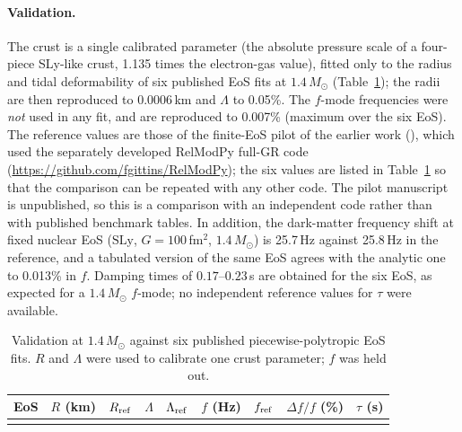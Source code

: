 \documentclass[11pt,a4paper]{article}
\newcommand{\Msun}{M_\odot}
\begin{document}
\paragraph{Validation.} The crust is a single calibrated parameter (the absolute pressure scale of a four-piece SLy-like crust, 1.135 times the electron-gas value), fitted only to the radius and tidal deformability of six published EoS fits at $1.4\,\Msun$ (Table~\ref{tab:valid}); the radii are then reproduced to 0.0006\,km and $\Lambda$ to 0.05\%. The $f$-mode frequencies were \emph{not} used in any fit, and are reproduced to 0.007\% (maximum over the six EoS). The reference values are those of the finite-EoS pilot of the earlier work (\citealt{HusainPilot}), which used the separately developed RelModPy full-GR code (\url{https://github.com/fgittins/RelModPy}); the six values are listed in Table~\ref{tab:valid} so that the comparison can be repeated with any other code. The pilot manuscript is unpublished, so this is a comparison with an independent code rather than with published benchmark tables. In addition, the dark-matter frequency shift at fixed nuclear EoS ($\mathrm{SLy}$, $G=100$\,fm$^2$, $1.4\,\Msun$) is 25.7\,Hz against 25.8\,Hz in the reference, and a tabulated version of the same EoS agrees with the analytic one to 0.013\% in $f$. Damping times of $0.17$--$0.23$\,s are obtained for the six EoS, as expected for a $1.4\,\Msun$ $f$-mode; no independent reference values for $\tau$ were available.
\begin{table}[t]\centering\small
\caption{Validation at $1.4\,\Msun$ against six published piecewise-polytropic EoS fits. $R$ and $\Lambda$ were used to calibrate one crust parameter; $f$ was held out.}\label{tab:valid}
\begin{tabular}{lrrrrrrrr}\toprule
EoS & $R$ (km) & $R_{\rm ref}$ & $\Lambda$ & $\Lambda_{\rm ref}$ & $f$ (Hz) & $f_{\rm ref}$ & $\Delta f/f$ (\%) & $\tau$ (s)\\\midrule
\\\bottomrule\end{tabular}\end{table}
\end{document}
